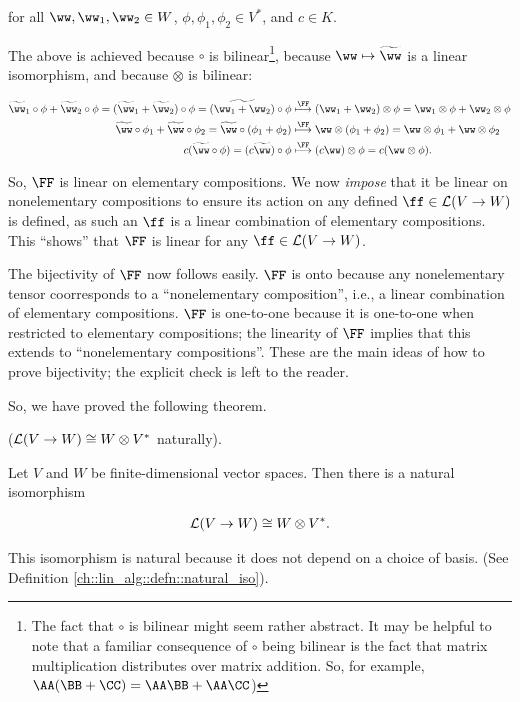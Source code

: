 \begin{deriv}
    for all $\ww, \ww_1, \ww_2 \in W$, $\phi, \phi_1, \phi_2 \in V^*$, and $c \in K$.
    
    The above is achieved because $\circ$ is bilinear\footnote{The fact that $\circ$ is bilinear might seem rather abstract. It may be helpful to note that a familiar consequence of $\circ$ being bilinear is the fact that matrix multiplication distributes over matrix addition. So, for example, $\AA(\BB + \CC) = \AA \BB + \AA \CC$)}, because $\ww \mapsto \tww$ is a linear isomorphism, and because $\otimes$ is bilinear:
    
    \begin{align*}
        \tww_1 \circ \phi + \tww_2 \circ \phi 
        = (\tww_1 + \tww_2) \circ \phi
        = \widetilde{(\ww_1 + \ww_2)} \circ \phi
        &\overset{\FF}{\longmapsto}
        (\ww_1 + \ww_2) \otimes \phi = \ww_1 \otimes \phi + \ww_2 \otimes \phi
        \\
        \tww \circ \phi_1 + \tww \circ \phi_2 
        = \tww \circ (\phi_1 + \phi_2)
        &\overset{\FF}{\longmapsto}
        \ww \otimes (\phi_1 + \phi_2)
        = \ww \otimes \phi_1 + \ww \otimes \phi_2
        \\
        c (\tww \circ \phi)
        = (c \tww) \circ \phi
        &\overset{\FF}{\longmapsto}
        (c \ww) \otimes \phi
        = c (\ww \otimes \phi).
    \end{align*}
    
    So, $\FF$ is linear on elementary compositions. We now \textit{impose} that it be linear on nonelementary compositions to ensure its action on any defined $\ff \in \LLLL(V \rightarrow W)$ is defined, as such an $\ff$ is a linear combination of elementary compositions. This ``shows'' that $\FF$ is linear for any $\ff \in \LLLL(V \rightarrow W)$.
    
    The bijectivity of $\FF$ now follows easily. $\FF$ is onto because any nonelementary tensor coorresponds to a ``nonelementary composition'', i.e., a linear combination of elementary compositions. $\FF$ is one-to-one because it is one-to-one when restricted to elementary compositions; the linearity of $\FF$ implies that this extends to ``nonelementary compositions''. These are the main ideas of how to prove bijectivity; the explicit check is left to the reader.
\end{deriv}

So, we have proved the following theorem.

\begin{theorem}
\label{ch::motivated_intro::thm::lin_V_W_iso_W_otimes_V}
    ($\mathcal{L}(V \rightarrow W) \cong W \otimes V^*$ naturally). 
    
    Let $V$ and $W$ be finite-dimensional vector spaces. Then there is a natural isomorphism
    
    \begin{align*}
        \mathcal{L}(V \rightarrow W) \cong W \otimes V^*.
    \end{align*}
    
    This isomorphism is natural because it does not depend on a choice of basis. (See Definition \ref{ch::lin_alg::defn::natural_iso}).
\end{theorem}

